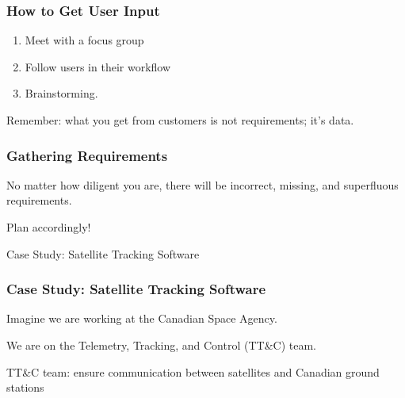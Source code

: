\begin{frame}
\frametitle{How to Get User Input}

\begin{changemargin}{1cm}

\begin{enumerate}
	\item Meet with a focus group
	\item Follow users in their workflow
	\item Brainstorming.
\end{enumerate}

Remember: what you get from customers is not requirements; it's data.

\end{changemargin}
\end{frame}


\begin{frame}
\frametitle{Gathering Requirements}

\begin{changemargin}{1cm}

No matter how diligent you are, there will be incorrect, missing, and superfluous requirements. 

Plan accordingly!

\end{changemargin}
\end{frame}


\begin{frame}
	
	
	\vspace{8em}
	
	\begin{block}
	 {\huge Case Study: Satellite Tracking Software }
	\end{block}
	
\end{frame}

\begin{frame}
	\frametitle{Case Study: Satellite Tracking Software}
	

	Imagine we are working at the Canadian Space Agency.
	
	We are on the Telemetry, Tracking, and Control (TT\&C) team.
	
	TT\&C team: ensure communication between satellites and Canadian ground stations

	
\end{frame}

